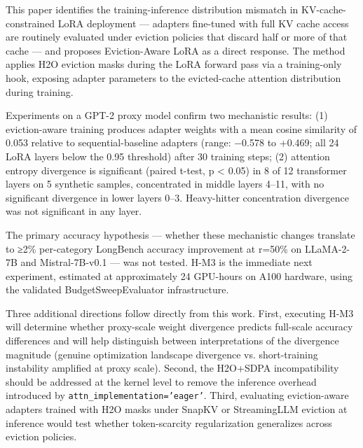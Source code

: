 
This paper identifies the training-inference distribution mismatch in KV-cache-constrained LoRA deployment — adapters fine-tuned with full KV cache access are routinely evaluated under eviction policies that discard half or more of that cache — and proposes Eviction-Aware LoRA as a direct response. The method applies H2O eviction masks during the LoRA forward pass via a training-only hook, exposing adapter parameters to the evicted-cache attention distribution during training.

Experiments on a GPT-2 proxy model confirm two mechanistic results: (1) eviction-aware training produces adapter weights with a mean cosine similarity of 0.053 relative to sequential-baseline adapters (range: −0.578 to +0.469; all 24 LoRA layers below the 0.95 threshold) after 30 training steps; (2) attention entropy divergence is significant (paired t-test, p < 0.05) in 8 of 12 transformer layers on 5 synthetic samples, concentrated in middle layers 4–11, with no significant divergence in lower layers 0–3. Heavy-hitter concentration divergence was not significant in any layer.

The primary accuracy hypothesis — whether these mechanistic changes translate to ≥2\% per-category LongBench accuracy improvement at r=50\% on LLaMA-2-7B and Mistral-7B-v0.1 — was not tested. H-M3 is the immediate next experiment, estimated at approximately 24 GPU-hours on A100 hardware, using the validated BudgetSweepEvaluator infrastructure.

Three additional directions follow directly from this work. First, executing H-M3 will determine whether proxy-scale weight divergence predicts full-scale accuracy differences and will help distinguish between interpretations of the divergence magnitude (genuine optimization landscape divergence vs. short-training instability amplified at proxy scale). Second, the H2O+SDPA incompatibility should be addressed at the kernel level to remove the inference overhead introduced by \texttt{attn_implementation='eager'}. Third, evaluating eviction-aware adapters trained with H2O masks under SnapKV or StreamingLLM eviction at inference would test whether token-scarcity regularization generalizes across eviction policies.

